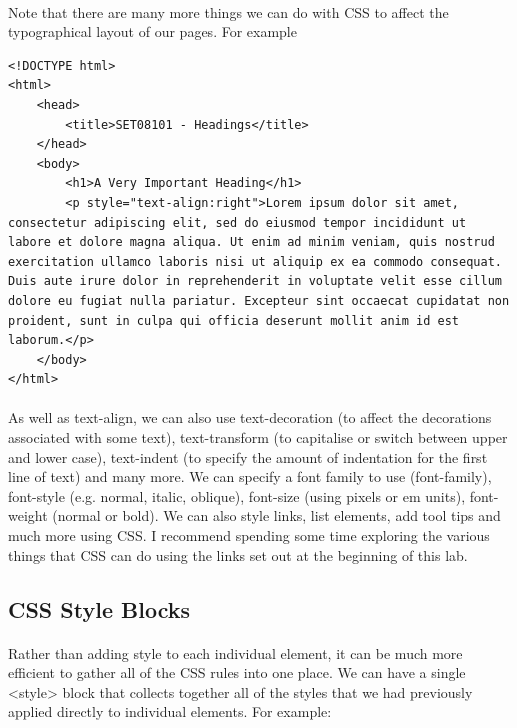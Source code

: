 \documentclass[10pt, a4paper, twosize]{article}
\begin{document}
\paragraph{} Note that there are many more things we can do with CSS to affect the typographical layout of our pages. For example

\begin{lstlisting}
<!DOCTYPE html>
<html>
    <head>
        <title>SET08101 - Headings</title>
    </head>
    <body>
        <h1>A Very Important Heading</h1>
        <p style="text-align:right">Lorem ipsum dolor sit amet, consectetur adipiscing elit, sed do eiusmod tempor incididunt ut labore et dolore magna aliqua. Ut enim ad minim veniam, quis nostrud exercitation ullamco laboris nisi ut aliquip ex ea commodo consequat. Duis aute irure dolor in reprehenderit in voluptate velit esse cillum dolore eu fugiat nulla pariatur. Excepteur sint occaecat cupidatat non proident, sunt in culpa qui officia deserunt mollit anim id est laborum.</p>
    </body>
</html>
\end{lstlisting}

\paragraph{} As well as text-align, we can also use text-decoration (to affect the decorations associated with some text), text-transform (to capitalise or switch between upper and lower case), text-indent (to specify the amount of indentation for the first line of text) and many more. We can specify a font family to use (font-family), font-style (e.g. normal, italic, oblique), font-size (using pixels or em units), font-weight (normal or bold). We can also style links, list elements, add tool tips and much more using CSS. I recommend spending some time exploring the various things that CSS can do using the links set out at the beginning of this lab.

\subsection{CSS Style Blocks}
\paragraph{} Rather than adding style to each individual element, it can be much more efficient to gather all of the CSS rules into one place. We can have a single <style> block that collects together all of the styles that we had previously applied directly to individual elements. For example:
\end{document}

